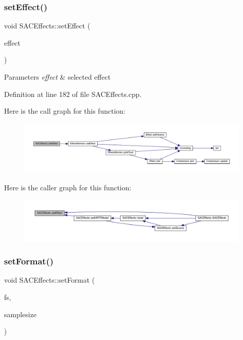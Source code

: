 \subsubsection{\texorpdfstring{set\+Effect()}{setEffect()}}
{\footnotesize\ttfamily void S\+A\+C\+Effects\+::set\+Effect (\begin{DoxyParamCaption}\item[{\hyperlink{class_effect_a6422fe21e9e452943fbc3344884a6fed}{Effect\+::effect\+ID}}]{effect }\end{DoxyParamCaption})}


\begin{DoxyParams}{Parameters}
{\em effect} & selected effect \\
\hline
\end{DoxyParams}


Definition at line 182 of file S\+A\+C\+Effects.\+cpp.

Here is the call graph for this function\+:
\nopagebreak
\begin{figure}[H]
\begin{center}
\leavevmode
\includegraphics[width=350pt]{class_s_a_c_effects_ab57fa3b5c11bafba4c2e471a80964c14_cgraph}
\end{center}
\end{figure}
Here is the caller graph for this function\+:
\nopagebreak
\begin{figure}[H]
\begin{center}
\leavevmode
\includegraphics[width=350pt]{class_s_a_c_effects_ab57fa3b5c11bafba4c2e471a80964c14_icgraph}
\end{center}
\end{figure}
\mbox{\label{class_s_a_c_effects_a3d06db323bc9a3a1bbfe810f2a30d10f}} 
\subsubsection{\texorpdfstring{set\+Format()}{setFormat()}}
{\footnotesize\ttfamily void S\+A\+C\+Effects\+::set\+Format (\begin{DoxyParamCaption}\item[{int}]{fs,  }\item[{int}]{samplesize }\end{DoxyParamCaption})}


